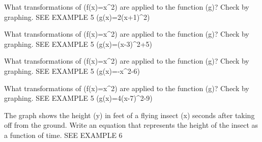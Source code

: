 \documentclass{article}
\newenvironment{practice}[2]{}{}        %
\newcommand{\answer}[1]{}               %
\newcommand{\placeholder}[2]{}          %
\begin{document}
\begin{practice}{29}{2}
What transformations of (f(x)=x^2) are applied to the function (g)? Check by graphing. SEE EXAMPLE 5
(g(x)=2(x+1)^2)
\answer{See back of book.}
\end{practice}
\begin{practice}{30}{2}
What transformations of (f(x)=x^2) are applied to the function (g)? Check by graphing. SEE EXAMPLE 5
(g(x)=(x-3)^2+5)
\answer{See back of book.}
\end{practice}
\begin{practice}{31}{2}
What transformations of (f(x)=x^2) are applied to the function (g)? Check by graphing. SEE EXAMPLE 5
(g(x)=-x^2-6)
\answer{See back of book.}
\end{practice}
\begin{practice}{32}{2}
What transformations of (f(x)=x^2) are applied to the function (g)? Check by graphing. SEE EXAMPLE 5
(g(x)=4(x-7)^2-9)
\answer{See back of book.}
\end{practice}
\begin{practice}{33}{3}
The graph shows the height (y) in feet of a flying insect (x) seconds after taking off from the ground. Write an equation that represents the height of the insect as a function of time. SEE EXAMPLE 6
\placeholder{graph}{Red downward parabola y=-(x-3)^2+9, visible from (0,0) to (6,0), vertex (3,9), downward-right arrow near (6,0), no marked point circles. x-axis Time (s), labels 0,2,4,6, unit grid; y-axis Height (ft), labels 0,2,4,6,8, unit grid. Axes arrowed, window approximately [0,7] by [0,9].}
\answer{(y=-(x-3)^2+9)}
\end{practice}
\end{document}
